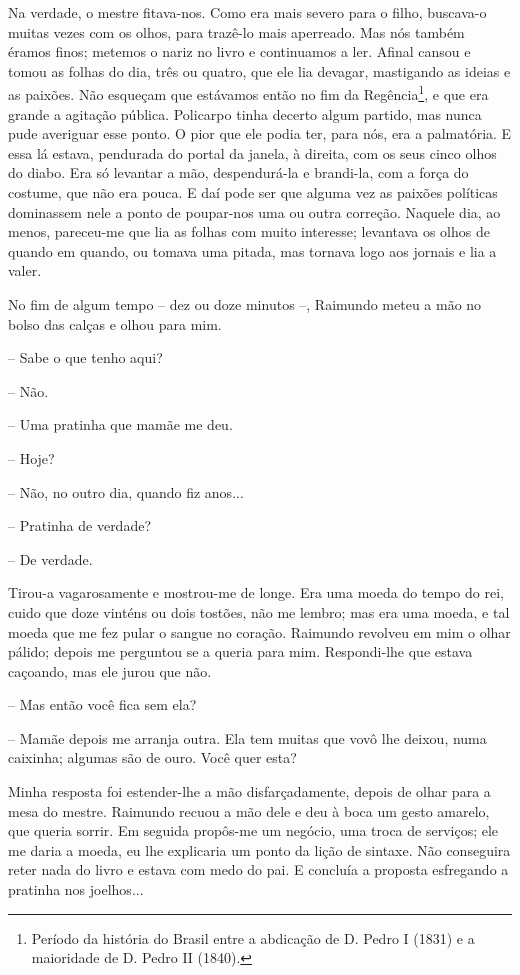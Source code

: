 Na verdade, o mestre fitava-nos. Como era mais severo para o filho,
buscava-o muitas vezes com os olhos, para trazê-lo mais aperreado. Mas
nós também éramos finos; metemos o nariz no livro e continuamos a ler.
Afinal cansou e tomou as folhas do dia, três ou quatro, que ele lia
devagar, mastigando as ideias e as paixões. Não esqueçam que estávamos
então no fim da Regência\footnote{Período da história do Brasil entre a
  abdicação de D. Pedro I (1831) e a maioridade de D. Pedro II (1840).},
e que era grande a agitação pública. Policarpo tinha decerto algum
partido, mas nunca pude averiguar esse ponto. O pior que ele podia ter,
para nós, era a palmatória. E essa lá estava, pendurada do portal da
janela, à direita, com os seus cinco olhos do diabo. Era só levantar a
mão, despendurá-la e brandi-la, com a força do costume, que não era
pouca. E daí pode ser que alguma vez as paixões políticas dominassem
nele a ponto de poupar-nos uma ou outra correção. Naquele dia, ao menos,
pareceu-me que lia as folhas com muito interesse; levantava os olhos de
quando em quando, ou tomava uma pitada, mas tornava logo aos jornais e
lia a valer.

No fim de algum tempo -- dez ou doze minutos --, Raimundo meteu a mão no
bolso das calças e olhou para mim.

-- Sabe o que tenho aqui?

-- Não.

-- Uma pratinha que mamãe me deu.

-- Hoje?

-- Não, no outro dia, quando fiz anos...

-- Pratinha de verdade?

-- De verdade.

Tirou-a vagarosamente e mostrou-me de longe. Era uma moeda do tempo do
rei, cuido que doze vinténs ou dois tostões, não me lembro; mas era uma
moeda, e tal moeda que me fez pular o sangue no coração. Raimundo
revolveu em mim o olhar pálido; depois me perguntou se a queria para
mim. Respondi-lhe que estava caçoando, mas ele jurou que não.

-- Mas então você fica sem ela?

-- Mamãe depois me arranja outra. Ela tem muitas que vovô lhe deixou,
numa caixinha; algumas são de ouro. Você quer esta?

Minha resposta foi estender-lhe a mão disfarçadamente, depois de olhar
para a mesa do mestre. Raimundo recuou a mão dele e deu à boca um gesto
amarelo, que queria sorrir. Em seguida propôs-me um negócio, uma troca
de serviços; ele me daria a moeda, eu lhe explicaria um ponto da lição
de sintaxe. Não conseguira reter nada do livro e estava com medo do pai.
E concluía a proposta esfregando a pratinha nos joelhos...

